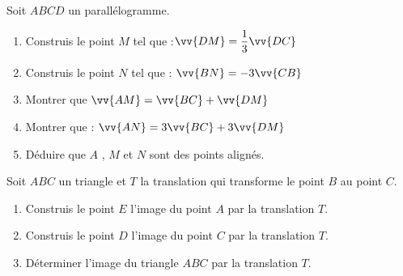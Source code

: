 \documentclass[a4paper,12pt]{article}
\begin{document}
\begin{exo}[5]
\begin{minipage}{.6\linewidth}
Soit $ABCD$ un parallélogramme.
\begin{enumerate}
\item Construis le point $M$ tel que :$\vv{DM}=\dfrac{1}{3}\vv{DC}$
\item Construis le point $N$ tel que : $\vv{BN}=-3\vv{CB}$
\item Montrer que $\vv{AM}=\vv{BC}+\vv{DM}$
\item Montrer que : $\vv{AN}=3\vv{BC}+3\vv{DM}$
\item Déduire que $A$ , $M$ et $N$ sont des points alignés.
\end{enumerate}
\end{minipage}%
\begin{minipage}[t]{.4\linewidth}
\end{minipage}
\begin{multicols}{2}
\anserline[10]
\columnbreak

\anserline[10]
\end{multicols}
\end{exo}

\begin{exo}[3]
Soit $ABC$ un triangle et $T$ la translation qui transforme le point $B$ au point $C$.
\begin{enumerate}
\item Construis le point $E$ l'image du point $A$ par la translation $T$.
\item Construis le point $D$ l'image du point $C$ par la translation $T$.
\item Déterminer l'image du triangle $ABC$ par la translation $T$.
\end{enumerate}
\end{exo}

\end{document}
